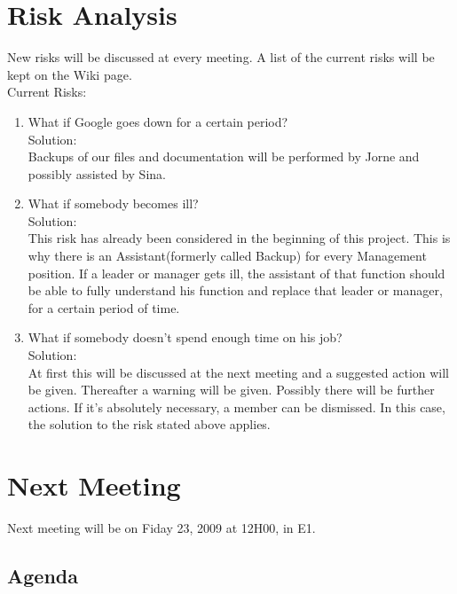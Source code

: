 \documentclass[a4paper, 12pt]{article}
\begin{document}
	\section{Risk Analysis}
	New risks will be discussed at every meeting. A list of the current risks will be kept on the Wiki page.\\
	Current Risks:
		\begin{enumerate}
		\item What if Google goes down for a certain period?\\
		Solution:\\
		Backups of our files and documentation will be performed by Jorne and possibly assisted by Sina.
		\item What if somebody becomes ill?\\
		Solution:\\
		This risk has already been considered in the beginning of this project. This is why there is an Assistant(formerly called Backup) for every Management position. If a leader or manager gets ill, the assistant of that function should be able to fully understand his function and replace that leader or manager, for a certain period of time.
		\item What if somebody doesn't spend enough time on his job?\\
		Solution:\\
		At first this will be discussed at the next meeting and a suggested action will be given. Thereafter a warning will be given. Possibly there will be further actions. If it's absolutely 			necessary, a member can be dismissed. In this case, the solution to the risk stated above applies.
		\end{enumerate}



	\section{Next Meeting}
	
	Next meeting will be on Fiday 23, 2009 at 12H00, in E1. 
	
	
	\subsection{Agenda}
	
\end{document}
